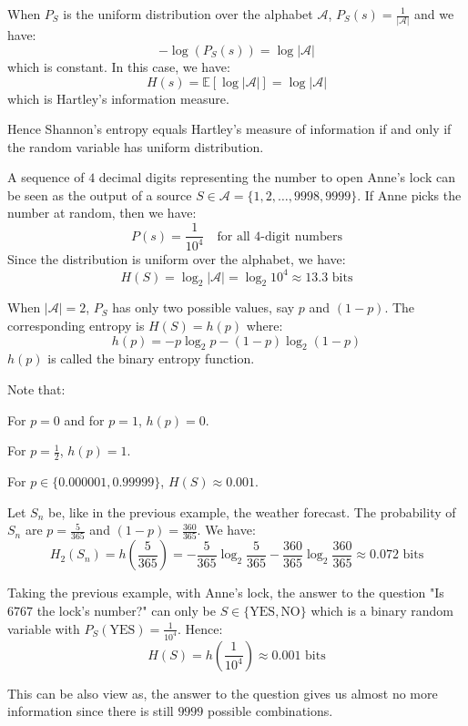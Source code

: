 \begin{eg}
    When $P_S$ is the uniform distribution over the alphabet $\mathcal{A}$, $P_S(s) = \frac{1}{|\mathcal{A}|}$ and we have:
    \[
        - \log (P_S(s)) = \log |\mathcal{A}|
    \]
    which is constant. In this case, we have:
    \[
        H(s) = \mathbb{E}[\log |\mathcal{A}|] = \log |\mathcal{A}|
    \]
    which is Hartley's information measure.
\end{eg}
Hence Shannon's entropy equals Hartley's measure of information if and only if the random variable has uniform distribution.

\begin{eg}
    A sequence of $4$ decimal digits representing the number to open Anne's lock can be seen as the output of a source $S \in \mathcal{A} = \{1, 2, \ldots, 9998, 9999\}$. If Anne picks the number at random, then we have:
    \[
        P(s) = \frac{1}{10^4} \quad \text{for all $4$-digit numbers}
    \]
    Since the distribution is uniform over the alphabet, we have:
    \[
        H(S) = \log_2 |\mathcal{A}| = \log_2 10^4 \approx 13.3 \text{ bits}
    \]
\end{eg}

\begin{definition}
    When $|\mathcal{A}| = 2$, $P_S$ has only two possible values, say $p$ and $(1-p)$. The corresponding entropy is $H(S) = h(p)$ where:
    \[
        h(p) = -p \log_2 p - (1-p)\log_2 (1-p)
    \]
    $h(p)$ is called the binary entropy function.
\end{definition}
Note that:
\begin{citemize}
    \item For $p = 0$ and for $p = 1$, $h(p) = 0$.
    \item For $p = \frac{1}{2}$, $h(p) = 1$.
    \item For $p \in \{0.000001, 0.99999\}$, $H(S) \approx 0.001$.
\end{citemize}

\begin{eg}
    Let $S_n$ be, like in the previous example, the weather forecast. The probability of $S_n$ are $p = \frac{5}{365}$ and $(1-p) = \frac{360}{365}$. We have:
    \[
        H_2(S_n) = h(\frac{5}{365}) = - \frac{5}{365} \log_2 \frac{5}{365} - \frac{360}{365} \log_2 \frac{360}{365} \approx 0.072 \text{ bits}
    \]
\end{eg}

\begin{eg}
    Taking the previous example, with Anne's lock, the answer to the question "Is $6767$ the lock's number?" can only be $S \in \{\text{YES}, \text{NO}\}$ which is a binary random variable with $P_S(\text{YES}) = \frac{1}{10^4}$. Hence:
    \[
        H(S) = h\left(\frac{1}{10^4}\right) \approx 0.001 \text{ bits}
    \]
\end{eg}
This can be also view as, the answer to the question gives us almost no more information since there is still $9999$ possible combinations.

